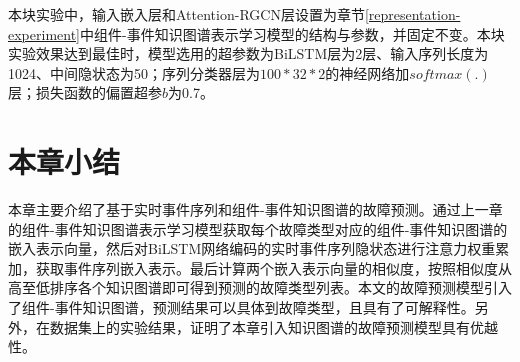 本块实验中，输入嵌入层和Attention-RGCN层设置为章节\ref{representation-experiment}中组件-事件知识图谱表示学习模型的结构与参数，并固定不变。本块实验效果达到最佳时，模型选用的超参数为BiLSTM层为2层、输入序列长度为1024、中间隐状态为50；序列分类器层为$100*32*2$的神经网络加$softmax(.)$层；损失函数的偏置超参$b$为0.7。

\section{本章小结}
本章主要介绍了基于实时事件序列和组件-事件知识图谱的故障预测。通过上一章的组件-事件知识图谱表示学习模型获取每个故障类型对应的组件-事件知识图谱的嵌入表示向量，然后对BiLSTM网络编码的实时事件序列隐状态进行注意力权重累加，获取事件序列嵌入表示。最后计算两个嵌入表示向量的相似度，按照相似度从高至低排序各个知识图谱即可得到预测的故障类型列表。本文的故障预测模型引入了组件-事件知识图谱，预测结果可以具体到故障类型，且具有了可解释性。另外，在数据集上的实验结果，证明了本章引入知识图谱的故障预测模型具有优越性。